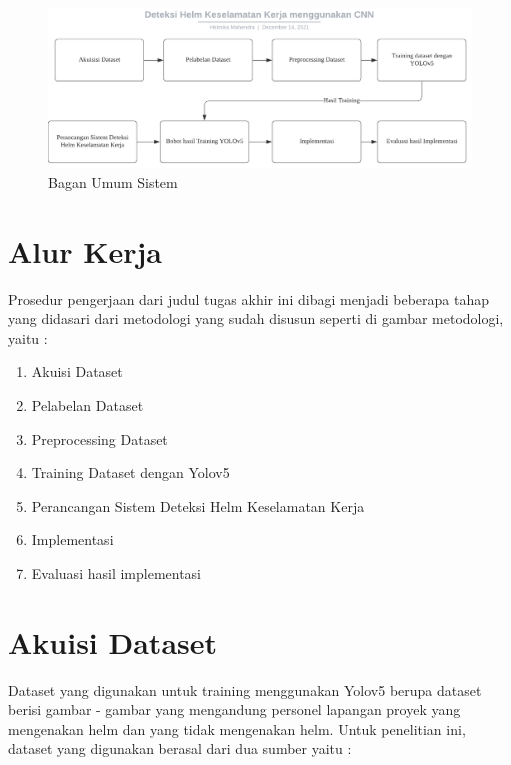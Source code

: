 \begin{figure}[ht]
  \centering
  \includegraphics[scale=0.7]{gambar/Metodologi CNN.png}
  \caption{Bagan Umum Sistem}
  \label{fig:baganumumsistem}  
\end{figure}

\section{Alur Kerja}
\label{sec:alurkerja}

Prosedur pengerjaan dari judul tugas akhir ini dibagi menjadi beberapa tahap yang didasari dari metodologi yang sudah disusun seperti di gambar metodologi, yaitu :

\begin{enumerate}[nolistsep]
  \item Akuisi Dataset
  \item Pelabelan Dataset
  \item Preprocessing Dataset
  \item Training Dataset dengan Yolov5
  \item Perancangan Sistem Deteksi Helm Keselamatan Kerja
  \item Implementasi
  \item Evaluasi hasil implementasi
\end{enumerate}


\section{Akuisi Dataset}
\label{sec:akuisisidataset}

Dataset yang digunakan untuk training menggunakan Yolov5 berupa dataset berisi gambar - gambar yang mengandung personel lapangan proyek yang mengenakan helm dan yang tidak mengenakan helm. Untuk penelitian ini, dataset yang digunakan berasal dari dua sumber yaitu :

